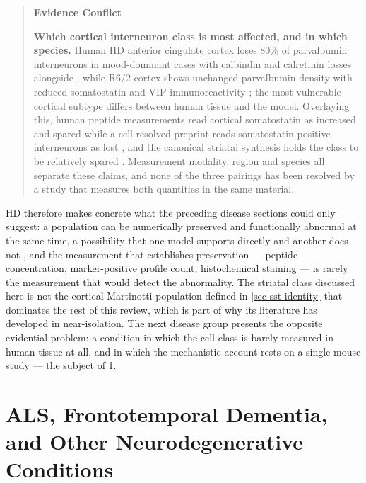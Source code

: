 \documentclass[11pt]{article}
\begin{document}
\begin{quote}
\noindent\textbf{Evidence Conflict}\par
\textbf{Which cortical interneuron class is most affected, and in which species.} Human HD anterior cingulate cortex loses 80\% of parvalbumin interneurons in mood-dominant cases with calbindin and calretinin losses alongside \citep{Kim2014}, while R6/2 cortex shows unchanged parvalbumin density with reduced somatostatin and VIP immunoreactivity \citep{Voelkl2022}; the most vulnerable cortical subtype differs between human tissue and the model. Overlaying this, human peptide measurements read cortical somatostatin as increased and spared \citep{Beal1988} while a cell-resolved preprint reads somatostatin-positive interneurons as lost \citep{VazquezSanchez2025}, and the canonical striatal synthesis holds the class to be relatively spared \citep{Morigaki2017}. Measurement modality, region and species all separate these claims, and none of the three pairings has been resolved by a study that measures both quantities in the same material.

\end{quote}

HD therefore makes concrete what the preceding disease sections could only suggest: a population can be numerically preserved and functionally abnormal at the same time, a possibility that one model supports directly \citep{Fowler2026} and another does not \citep{Holley2018}, and the measurement that establishes preservation --- peptide concentration, marker-positive profile count, histochemical staining --- is rarely the measurement that would detect the abnormality. The striatal class discussed here is not the cortical Martinotti population defined in \ref{sec-sst-identity} that dominates the rest of this review, which is part of why its literature has developed in near-isolation. The next disease group presents the opposite evidential problem: a condition in which the cell class is barely measured in human tissue at all, and in which the mechanistic account rests on a single mouse study --- the subject of \ref{sec-als-ftd}.

\section{ALS, Frontotemporal Dementia, and Other Neurodegenerative Conditions}
\label{sec-als-ftd}
\end{document}
